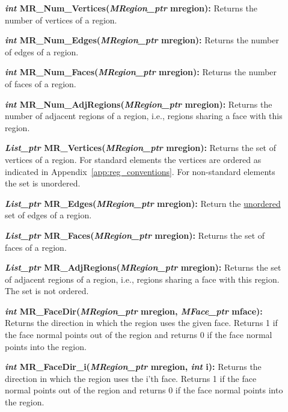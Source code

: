 \documentclass[12pt]{article}
\begin{document}
\begin{description}
\item[]\textbf{\textit{int} MR\_Num\_Vertices(\textit{MRegion\_ptr}
mregion):} Returns the number of vertices of a region.

\item[]\textbf{\textit{int} MR\_Num\_Edges(\textit{MRegion\_ptr} mregion):}
Returns the number of edges of a region.

\item[]\textbf{\textit{int} MR\_Num\_Faces(\textit{MRegion\_ptr} mregion):}
Returns the number of faces of a region.

\item[]\textbf{\textit{int} MR\_Num\_AdjRegions(\textit{MRegion\_ptr}
mregion):} Returns the number of adjacent regions of a region, i.e.,
regions sharing a face with this region.

\item[]\textbf{\textit{List\_ptr} MR\_Vertices(\textit{MRegion\_ptr}
mregion):} Returns the set of vertices of a region. For standard
elements the vertices are ordered as indicated in
Appendix~\ref{app:reg_conventions}. For non-standard elements the set
is unordered.

\item[]\textbf{\textit{List\_ptr} MR\_Edges(\textit{MRegion\_ptr} mregion):}
Return the \underline{unordered} set of edges of a region. 

\item[]\textbf{\textit{List\_ptr} MR\_Faces(\textit{MRegion\_ptr} mregion):}
Returns the set of faces of a region.

\item[]\textbf{\textit{List\_ptr} MR\_AdjRegions(\textit{MRegion\_ptr}
mregion):} Returns the set of adjacent regions of a region, i.e.,
regions sharing a face with this region. The set is not ordered.

\item[]\textbf{\textit{int} MR\_FaceDir(\textit{MRegion\_ptr} mregion,
\textit{MFace\_ptr} mface):} Returns the direction in which the region
uses the given face. Returns 1 if the face normal points out of the
region and returns 0 if the face normal points into the region.

\item[]\textbf{\textit{int} MR\_FaceDir\_i(\textit{MRegion\_ptr} mregion,
\textit{int} i):} Returns the direction in which the region uses the
i'th face. Returns 1 if the face normal points out of the region and
returns 0 if the face normal points into the region.


\end{description}
\end{document}
